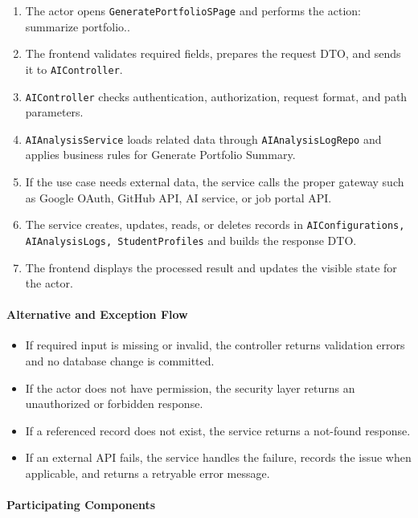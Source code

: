 \begin{enumerate}
    \item The actor opens \texttt{GeneratePortfolioSPage} and performs the action: summarize portfolio..
    \item The frontend validates required fields, prepares the request DTO, and sends it to \texttt{AIController}.
    \item \texttt{AIController} checks authentication, authorization, request format, and path parameters.
    \item \texttt{AIAnalysisService} loads related data through \texttt{AIAnalysisLogRepo} and applies business rules for Generate Portfolio Summary.
    \item If the use case needs external data, the service calls the proper gateway such as Google OAuth, GitHub API, AI service, or job portal API.
    \item The service creates, updates, reads, or deletes records in \texttt{AIConfigurations, AIAnalysisLogs, StudentProfiles} and builds the response DTO.
    \item The frontend displays the processed result and updates the visible state for the actor.
\end{enumerate}

\paragraph{Alternative and Exception Flow}

\begin{itemize}
    \item If required input is missing or invalid, the controller returns validation errors and no database change is committed.
    \item If the actor does not have permission, the security layer returns an unauthorized or forbidden response.
    \item If a referenced record does not exist, the service returns a not-found response.
    \item If an external API fails, the service handles the failure, records the issue when applicable, and returns a retryable error message.
\end{itemize}

\paragraph{Participating Components}

